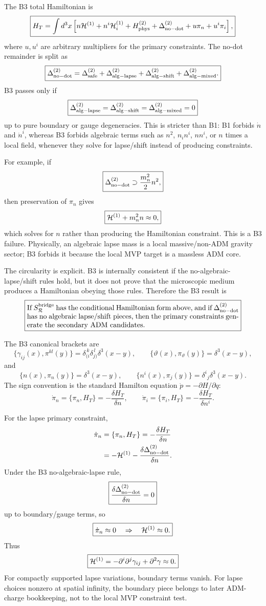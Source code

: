 \documentclass[11pt]{article}
\begin{document}
The B3 total Hamiltonian is
\[
\boxed{
H_T=\int d^3x\left[
n{\cal H}^{(1)}
+n^i{\cal H}_i^{(1)}
+H_{\rm phys}^{(2)}
+\Delta_{\rm no-dot}^{(2)}
+u\pi_n+u^i\pi_i
\right],
}
\]
where \(u,u^i\) are arbitrary multipliers for the primary constraints.  The
no-dot remainder is split as
\[
\boxed{
\Delta_{\rm no-dot}^{(2)}
=\Delta_{\rm safe}^{(2)}
+\Delta_{\rm alg-lapse}^{(2)}
+\Delta_{\rm alg-shift}^{(2)}
+\Delta_{\rm alg-mixed}^{(2)}.
}
\]
B3 passes only if
\[
\boxed{
\Delta_{\rm alg-lapse}^{(2)}
=\Delta_{\rm alg-shift}^{(2)}
=\Delta_{\rm alg-mixed}^{(2)}=0
}
\]
up to pure boundary or gauge degeneracies.  This is stricter than B1: B1
forbids \(\dot n\) and \(\dot n^i\), whereas B3 forbids algebraic terms such
as \(n^2\), \(n_in^i\), \(nn^i\), or \(n\) times a local field, whenever they
solve for lapse/shift instead of producing constraints.

For example, if
\[
\boxed{\Delta_{\rm no-dot}^{(2)}\supset \frac{m_n^2}{2}n^2,}
\]
then preservation of \(\pi_n\) gives
\[
\boxed{{\cal H}^{(1)}+m_n^2n\approx0,}
\]
which solves for \(n\) rather than producing the Hamiltonian constraint.  This
is a B3 failure.  Physically, an algebraic lapse mass is a local
massive/non-ADM gravity sector; B3 forbids it because the local MVP target is
a massless ADM core.

The circularity is explicit.  B3 is internally consistent if the
no-algebraic-lapse/shift rules hold, but it does not prove that the microscopic
medium produces a Hamiltonian obeying those rules.  Therefore the B3 result is
\[
\boxed{
\begin{minipage}{0.86\linewidth}
If \(S_{\mathcal R}^{\rm bridge}\) has the conditional Hamiltonian form above,
and if \(\Delta_{\rm no-dot}^{(2)}\) has no algebraic lapse/shift pieces, then
the primary constraints generate the secondary ADM candidates.
\end{minipage}}
\]

The B3 canonical brackets are
\[
\boxed{
\{\gamma_{ij}(x),\pi^{kl}(y)\}
=\delta_{(i}^{\,k}\delta_{j)}^{\,l}\delta^3(x-y),
\qquad
\{\vartheta(x),\pi_\vartheta(y)\}=\delta^3(x-y),
}
\]
and
\[
\boxed{
\{n(x),\pi_n(y)\}=\delta^3(x-y),\qquad
\{n^i(x),\pi_j(y)\}=\delta^i{}_j\delta^3(x-y).
}
\]
The sign convention is the standard Hamilton equation
\(\dot p=-\partial H/\partial q\):
\[
\boxed{
\dot\pi_n=\{\pi_n,H_T\}=-\frac{\delta H_T}{\delta n},
\qquad
\dot\pi_i=\{\pi_i,H_T\}=-\frac{\delta H_T}{\delta n^i}.
}
\]

For the lapse primary constraint,
\[
\begin{aligned}
\dot\pi_n
&=\{\pi_n,H_T\}
=-\frac{\delta H_T}{\delta n}\\
&=-{\cal H}^{(1)}
-\frac{\delta\Delta_{\rm no-dot}^{(2)}}{\delta n}.
\end{aligned}
\]
Under the B3 no-algebraic-lapse rule,
\[
\boxed{\frac{\delta\Delta_{\rm no-dot}^{(2)}}{\delta n}=0}
\]
up to boundary/gauge terms, so
\[
\boxed{\dot\pi_n\approx0\quad\Rightarrow\quad
{\cal H}^{(1)}\approx0.}
\]
Thus
\[
\boxed{
{\cal H}^{(1)}
=-\partial^i\partial^j\gamma_{ij}+\partial^2\gamma\approx0.
}
\]
For compactly supported lapse variations, boundary terms vanish.  For lapse
choices nonzero at spatial infinity, the boundary piece belongs to later
ADM-charge bookkeeping, not to the local MVP constraint test.
\end{document}
